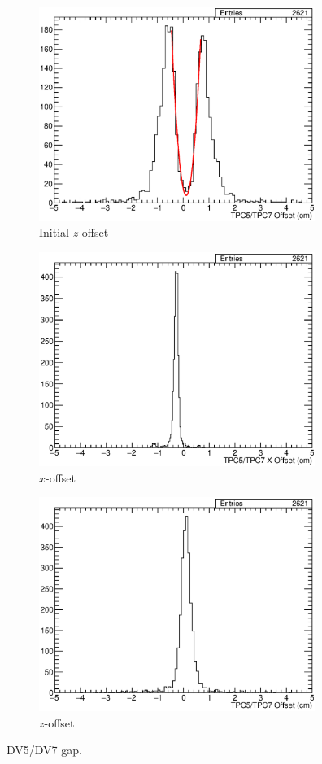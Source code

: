 \begin{figure}
  \centering
  \begin{subfigure}[t]{\linewidth}
    \centering
    \includegraphics[width=9cm]{TPC5TPC7GapFit.eps}
    \caption{Initial $z$-offset}
    \label{fig:AppendixTPC5TPC7Gap}
  \end{subfigure}
  \vfill
  \begin{subfigure}[t]{\linewidth}
    \centering
    \includegraphics[width=9cm]{TPC5TPC7XOff.eps}
    \caption{$x$-offset}
    \label{fig:AppendixTPC5TPC7XOff}
  \end{subfigure}
  \vfill
  \begin{subfigure}[t]{\linewidth}
    \centering
    \includegraphics[width=9cm]{TPC5TPC7ZOff.eps}
    \caption{$z$-offset}
    \label{fig:AppendixTPC5TPC7ZOff}
  \end{subfigure}
  \caption[Demonstration of the measurements of the $x$- and $z$-offsets in the 35-ton DV5/DV7 gap.]{DV5/DV7 gap.}
  \label{fig:AppendixTPC5TPC7}
\end{figure}
